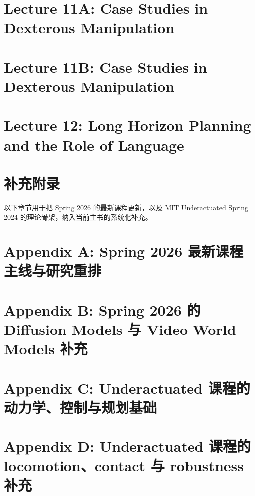 \documentclass[a4paper]{article}
\begin{document}
\section{Lecture 11A: Case Studies in Dexterous Manipulation}


\section{Lecture 11B: Case Studies in Dexterous Manipulation}


\section{Lecture 12: Long Horizon Planning and the Role of Language}


\appendix
\section*{补充附录}
以下章节用于把 Spring 2026 的最新课程更新，以及 MIT Underactuated Spring 2024 的理论骨架，纳入当前主书的系统化补充。

\section{Appendix A: Spring 2026 最新课程主线与研究重排}


\section{Appendix B: Spring 2026 的 Diffusion Models 与 Video World Models 补充}


\section{Appendix C: Underactuated 课程的动力学、控制与规划基础}


\section{Appendix D: Underactuated 课程的 locomotion、contact 与 robustness 补充}

\end{document}
